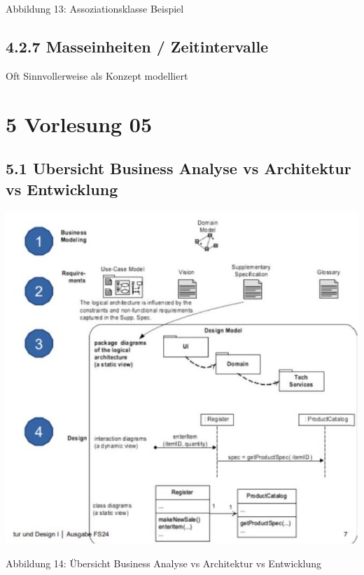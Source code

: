 \documentclass[10pt]{article}
\begin{document}
Abbildung 13: Assoziationsklasse Beispiel

\subsection*{4.2.7 Masseinheiten / Zeitintervalle}
Oft Sinnvollerweise als Konzept modelliert

\section*{5 Vorlesung 05}
\subsection*{5.1 Ubersicht Business Analyse vs Architektur vs Entwicklung}
\begin{center}
\includegraphics[max width=\textwidth]{2024_12_29_0d1d7b5551ea1b4b41bdg-07(2)}
\end{center}

Abbildung 14: Übersicht Business Analyse vs Architektur vs Entwicklung
\end{document}
